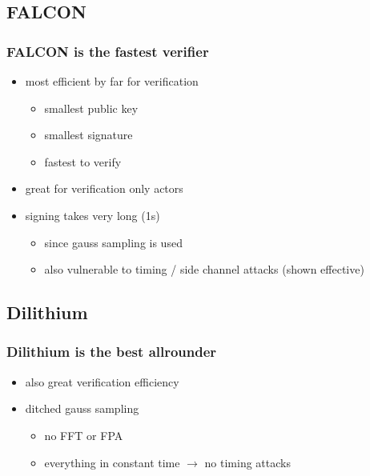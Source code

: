 \documentclass[ucs,10pt]{beamer}
\begin{document}
\subsection{FALCON}
\begin{frame}
  \frametitle{FALCON is the fastest verifier}

  \begin{itemize}
    \item most efficient by far for verification 
    \begin{itemize}
      \item smallest public key
      \item smallest signature
      \item fastest to verify
    \end{itemize}
    \item great for verification only actors
    \item signing takes very long (1s)
    \begin{itemize}
      \item since gauss sampling is used
      \item also vulnerable to timing / side channel attacks (shown effective)
    \end{itemize}
  \end{itemize}

\end{frame}

\subsection{Dilithium}
\begin{frame}
  \frametitle{Dilithium is the best allrounder}

  \begin{itemize}
    \item also great verification efficiency 
    \item ditched gauss sampling
    \begin{itemize}
      \item no FFT or FPA 
      \item everything in constant time $\rightarrow$ no timing attacks
    \end{itemize}
  \end{itemize}

\end{frame}
\end{document}
